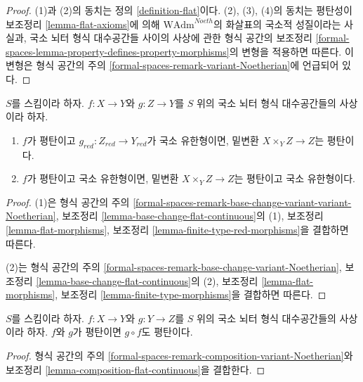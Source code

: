 \begin{proof}
(1)과 (2)의 동치는 정의 \ref{definition-flat}이다.
(2), (3), (4)의 동치는 평탄성이 보조정리
\ref{lemma-flat-axioms}에 의해 $\text{WAdm}^{Noeth}$의 화살표의
국소적 성질이라는 사실과, 국소 뇌터 형식 대수공간들 사이의 사상에 관한
형식 공간의 보조정리
\ref{formal-spaces-lemma-property-defines-property-morphisms}의 변형을
적용하면 따른다. 이 변형은 형식 공간의 주의
\ref{formal-spaces-remark-variant-Noetherian}에 언급되어 있다.
\end{proof}

\begin{lemma}
\label{lemma-base-change-flat}
$S$를 스킴이라 하자. $f : X \to Y$와 $g : Z \to Y$를
$S$ 위의 국소 뇌터 형식 대수공간들의 사상이라 하자.
\begin{enumerate}
\item $f$가 평탄이고 $g_{red} : Z_{red} \to Y_{red}$가 국소 유한형이면,
밑변환 $X \times_Y Z \to Z$는 평탄이다.
\item $f$가 평탄이고 국소 유한형이면,
밑변환 $X \times_Y Z \to Z$는 평탄이고 국소 유한형이다.
\end{enumerate}
\end{lemma}

\begin{proof}
(1)은 형식 공간의 주의
\ref{formal-spaces-remark-base-change-variant-variant-Noetherian},
보조정리 \ref{lemma-base-change-flat-continuous}의 (1),
보조정리 \ref{lemma-flat-morphisms}, 보조정리
\ref{lemma-finite-type-red-morphisms}을 결합하면 따른다.

\medskip\noindent
(2)는 형식 공간의 주의
\ref{formal-spaces-remark-base-change-variant-Noetherian},
보조정리 \ref{lemma-base-change-flat-continuous}의 (2),
보조정리 \ref{lemma-flat-morphisms}, 보조정리
\ref{lemma-finite-type-morphisms}을 결합하면 따른다.
\end{proof}

\begin{lemma}
\label{lemma-composition-flat}
$S$를 스킴이라 하자. $f : X \to Y$와 $g : Y \to Z$를
$S$ 위의 국소 뇌터 형식 대수공간들의 사상이라 하자.
$f$와 $g$가 평탄이면 $g \circ f$도 평탄이다.
\end{lemma}

\begin{proof}
형식 공간의 주의
\ref{formal-spaces-remark-composition-variant-Noetherian}와
보조정리 \ref{lemma-composition-flat-continuous}을 결합한다.
\end{proof}

